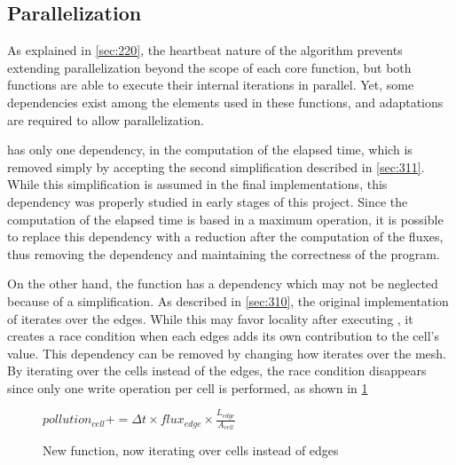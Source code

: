 \subsection{Parallelization}

As explained in \cref{sec:220}, the heartbeat nature of the algorithm prevents extending parallelization beyond the scope of each core function, but both functions are able to execute their internal iterations in parallel. Yet, some dependencies exist among the elements used in these functions, and adaptations are required to allow parallelization.


\computeflux has only one dependency, in the computation of the elapsed time, which is removed simply by accepting the second simplification described in \cref{sec:311}. While this simplification is assumed in the final implementations, this dependency was properly studied in early stages of this project. Since the computation of the elapsed time is based in a maximum operation, it is possible to replace this dependency with a reduction  after the computation of the fluxes, thus removing the dependency and maintaining the correctness of the program.

On the other hand, the \update function has a dependency which may not be neglected because of a simplification. As described in \cref{sec:310}, the original implementation of \update iterates over the edges. While this may favor locality after executing \computeflux, it creates a race condition when each edges adds its own contribution to the cell's value. This dependency can be removed by changing how \update iterates over the mesh. By iterating over the cells instead of the edges, the race condition disappears since only one write operation per cell is performed, as shown in \cref{alg:update2}

\begin{figure}[!htp]
	\begin{alg}
				\State $pollution_{cell} += \Delta{t} \times flux_{edge} \times \frac{L_{edge}}{A_{cell}}$
			\EndFor
		\EndFor
	\end{alg}

	\caption{New \update function, now iterating over cells instead of edges}
	\label{alg:update2}
\end{figure}
